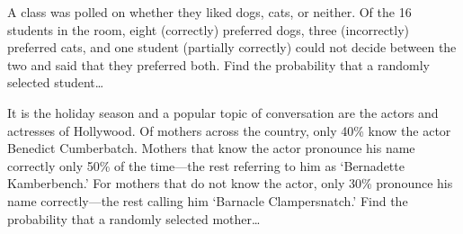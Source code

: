 \documentclass[12pt,letterpaper]{exam}
\begin{document}
\begin{questions}
\newpage
\question A class was polled on whether they liked dogs, cats, or neither. Of the 16 students in the room, eight (correctly) preferred dogs, three (incorrectly) preferred cats, and one student (partially correctly) could not decide between the two and said that they preferred both. Find the probability that a randomly selected student\dots





\newpage
\question It is the holiday season and a popular topic of conversation are the actors and actresses of Hollywood. Of mothers across the country, only 40\% know the actor Benedict Cumberbatch. Mothers that know the actor pronounce his name correctly only 50\% of the time---the rest referring to him as `Bernadette Kamberbench.' For mothers that do not know the actor, only 30\% pronounce his name correctly---the rest calling him `Barnacle Clampersnatch.' Find the probability that a randomly selected mother\dots

\end{questions}
\end{document}
